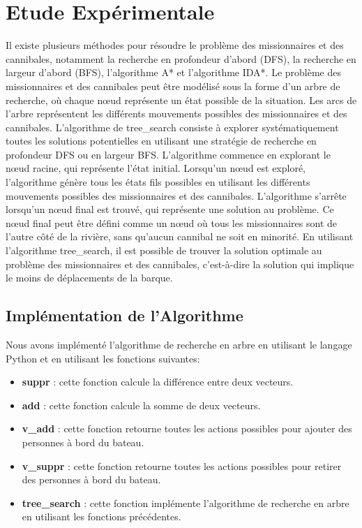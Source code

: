 \documentclass{article}
\begin{document}
\section{Etude Expérimentale}

Il existe plusieurs méthodes pour résoudre le problème des missionnaires et des cannibales, notamment la recherche en profondeur d'abord (DFS), la recherche en largeur d'abord (BFS), l'algorithme A* et l'algorithme IDA*. 
\newline
Le problème des missionnaires et des cannibales peut être modélisé sous la forme d'un arbre de recherche, où chaque nœud représente un état possible de la situation. Les arcs de l'arbre représentent les différents mouvements possibles des missionnaires et des cannibales. L'algorithme de tree\_search consiste à explorer systématiquement toutes les solutions potentielles en utilisant une stratégie de recherche en profondeur DFS ou en largeur BFS.
\newline
L'algorithme commence en explorant le nœud racine, qui représente l'état initial. Lorsqu'un nœud est exploré, l'algorithme génère tous les états fils possibles en utilisant les différents mouvements possibles des missionnaires et des cannibales. L'algorithme s'arrête lorsqu'un nœud final est trouvé, qui représente une solution au problème. Ce nœud final peut être défini comme un nœud où tous les missionnaires sont de l'autre côté de la rivière, sans qu'aucun cannibal ne soit en minorité.
\newline
En utilisant l'algorithme tree\_search, il est possible de trouver la solution optimale au problème des missionnaires et des cannibales, c'est-à-dire la solution qui implique le moins de déplacements de la barque.


\subsection{Implémentation de l'Algorithme}
Nous avons implémenté l'algorithme de recherche en arbre en utilisant le langage Python et en utilisant les fonctions suivantes:
\begin{itemize}
\item \textbf{suppr} : cette fonction calcule la différence entre deux vecteurs.
\item \textbf{add} : cette fonction calcule la somme de deux vecteurs.
\item \textbf{v\_add} : cette fonction retourne toutes les actions possibles pour ajouter des personnes à bord du bateau.
\item \textbf{v\_suppr} : cette fonction retourne toutes les actions possibles pour retirer des personnes à bord du bateau.
\item \textbf{tree\_search} : cette fonction implémente l'algorithme de recherche en arbre en utilisant les fonctions précédentes.
\end{itemize}
\end{document}
